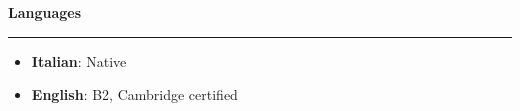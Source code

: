 \documentclass[9pt, a4paper]{article}
\newcommand{\cvsection}[1]{%
	\vspace{2pt}\par
	{\Large\bfseries\color{sectionblue}#1}\par
	\vspace{2pt}\hrule\vspace{6pt}
}
\begin{document}
\begin{minipage}[t]{0.32\linewidth}
		\cvsection{Languages}
		\begin{itemize}[leftmargin=*, nosep, itemsep=2pt]
			\item \textbf{Italian}: Native
			\item \textbf{English}: B2, Cambridge certified
		\end{itemize}
		
	\end{minipage}
	
\end{document}
